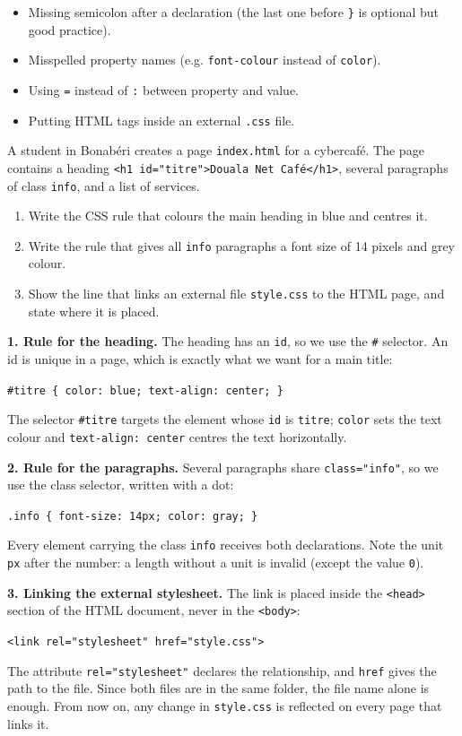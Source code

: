 \documentclass[11pt]{article}
\begin{document}
\begin{attention}
\begin{itemize}
\item Missing semicolon after a declaration (the last one before \texttt{\}} is optional but good practice).
\item Misspelled property names (e.g. \texttt{font-colour} instead of \texttt{color}).
\item Using \texttt{=} instead of \texttt{:} between property and value.
\item Putting HTML tags inside an external \texttt{.css} file.
\end{itemize}
\end{attention}

\begin{exoresolu}
A student in Bonabéri creates a page \texttt{index.html} for a cybercafé. The page contains a heading \texttt{<h1 id="titre">Douala Net Café</h1>}, several paragraphs of class \texttt{info}, and a list of services.
\begin{enumerate}
\item Write the CSS rule that colours the main heading in blue and centres it.
\item Write the rule that gives all \texttt{info} paragraphs a font size of 14 pixels and grey colour.
\item Show the line that links an external file \texttt{style.css} to the HTML page, and state where it is placed.
\end{enumerate}
\tcblower
\textbf{1. Rule for the heading.} The heading has an \texttt{id}, so we use the \texttt{\#} selector. An id is unique in a page, which is exactly what we want for a main title:
\begin{center}
\texttt{\#titre \{ color: blue; text-align: center; \}}
\end{center}
The selector \texttt{\#titre} targets the element whose \texttt{id} is \texttt{titre}; \texttt{color} sets the text colour and \texttt{text-align: center} centres the text horizontally.

\textbf{2. Rule for the paragraphs.} Several paragraphs share \texttt{class="info"}, so we use the class selector, written with a dot:
\begin{center}
\texttt{.info \{ font-size: 14px; color: gray; \}}
\end{center}
Every element carrying the class \texttt{info} receives both declarations. Note the unit \texttt{px} after the number: a length without a unit is invalid (except the value \texttt{0}).

\textbf{3. Linking the external stylesheet.} The link is placed inside the \texttt{<head>} section of the HTML document, never in the \texttt{<body>}:
\begin{center}
\texttt{<link rel="stylesheet" href="style.css">}
\end{center}
The attribute \texttt{rel="stylesheet"} declares the relationship, and \texttt{href} gives the path to the file. Since both files are in the same folder, the file name alone is enough. From now on, any change in \texttt{style.css} is reflected on every page that links it.
\end{exoresolu}
\end{document}

